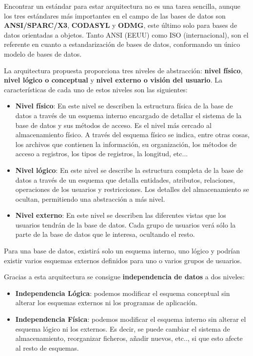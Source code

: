Encontrar un estándar para estar arquitectura no es una tarea sencilla, aunque los tres estándares más importantes en el campo de las bases de datos son \textbf{ANSI/SPARC/X3}, \textbf{CODASYL} y \textbf{ODMG}, este último solo para bases de datos orientadas a objetos. Tanto ANSI (EEUU) como ISO (internacional), son el referente en cuanto a estandarización de bases de datos, conformando un único modelo de bases de datos.

La arquitectura propuesta proporciona tres niveles de abstracción: \textbf{nivel físico}, \textbf{nivel lógico o conceptual} y \textbf{nivel externo o visión del usuario}. La características de cada uno de estos niveles son las siguientes:

\begin{itemize}
    \item \textbf{Nivel físico}: En este nivel se describen la estructura física de la base de datos a través de un esquema interno encargado de detallar el sistema de la base de datos y sus métodos de acceso. Es el nivel más cercado al almacenamiento físico. A través del esquema físico se indica, entre otras cosas, los archivos que contienen la información, su organización, los métodos de acceso a registros, los tipos de registros, la longitud, etc...

    \item \textbf{Nivel lógico}: En este nivel se describe la estructura completa de la base de datos a través de un esquema que detalla entidades, atributos, relaciones, operaciones de los usuarios y restricciones. Los detalles del almacenamiento se ocultan, permitiendo una abstracción a más nivel.

    \item \textbf{Nivel externo}: En este nivel se describen las diferentes vistas que los usuarios tendrán de la base de datos. Cada grupo de usuarios verá sólo la parte de la base de datos que le interesa, ocultando el resto.
\end{itemize}

Para una base de datos, existirá solo un esquema interno, uno lógico y podrían existir varios esquemas externos definidos para uno o varios grupos de usuarios.

Gracias a esta arquitectura se consigue \textbf{independencia de datos} a dos niveles:
\begin{itemize}
    \item \textbf{Independencia Lógica}: podemos modificar el esquema conceptual sin alterar los esquemas externos ni los programas de aplicación.

    \item \textbf{Independencia Física}: podemos modificar el esquema interno sin alterar el esquema lógico ni los externos. Es decir, se puede cambiar el sistema de almacenamiento, reorganizar ficheros, añadir nuevos, etc.., si que esto afecte al resto de esquemas.
\end{itemize}

